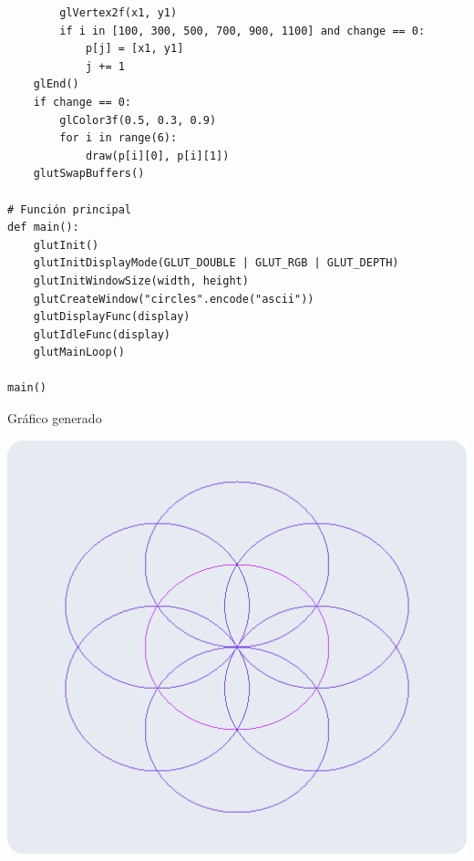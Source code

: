 \documentclass[a4paper]{article}
\begin{document}
\begin{center}
\begin{mycodebox}
\begin{lstlisting}
        glVertex2f(x1, y1)
        if i in [100, 300, 500, 700, 900, 1100] and change == 0:
            p[j] = [x1, y1]
            j += 1
    glEnd()
    if change == 0:
        glColor3f(0.5, 0.3, 0.9)  
        for i in range(6):
            draw(p[i][0], p[i][1])
    glutSwapBuffers()

# Función principal
def main():
    glutInit()
    glutInitDisplayMode(GLUT_DOUBLE | GLUT_RGB | GLUT_DEPTH)
    glutInitWindowSize(width, height)
    glutCreateWindow("circles".encode("ascii"))
    glutDisplayFunc(display)
    glutIdleFunc(display)
    glutMainLoop()

main()
\end{lstlisting}
\end{mycodebox}
\end{center}
\newpage
Gráfico generado 
\begin{center}
\includegraphics[width=17cm]{src/4.png}
\end{center}
\newpage
\end{document}
